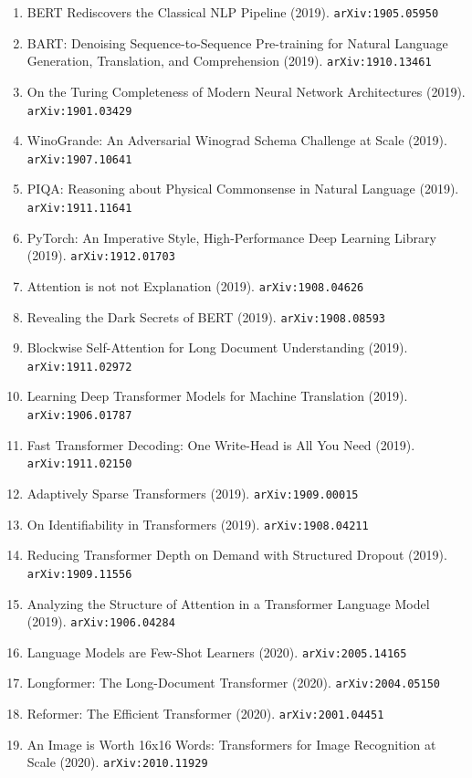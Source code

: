 \documentclass[11pt]{article}
\begin{document}
\begin{enumerate}
  \item BERT Rediscovers the Classical NLP Pipeline (2019). \texttt{arXiv:1905.05950}
  \item BART: Denoising Sequence-to-Sequence Pre-training for Natural Language
  Generation, Translation, and Comprehension (2019). \texttt{arXiv:1910.13461}
  \item On the Turing Completeness of Modern Neural Network Architectures (2019). \texttt{arXiv:1901.03429}
  \item WinoGrande: An Adversarial Winograd Schema Challenge at Scale (2019). \texttt{arXiv:1907.10641}
  \item PIQA: Reasoning about Physical Commonsense in Natural Language (2019). \texttt{arXiv:1911.11641}
  \item PyTorch: An Imperative Style, High-Performance Deep Learning Library (2019). \texttt{arXiv:1912.01703}
  \item Attention is not not Explanation (2019). \texttt{arXiv:1908.04626}
  \item Revealing the Dark Secrets of BERT (2019). \texttt{arXiv:1908.08593}
  \item Blockwise Self-Attention for Long Document Understanding (2019). \texttt{arXiv:1911.02972}
  \item Learning Deep Transformer Models for Machine Translation (2019). \texttt{arXiv:1906.01787}
  \item Fast Transformer Decoding: One Write-Head is All You Need (2019). \texttt{arXiv:1911.02150}
  \item Adaptively Sparse Transformers (2019). \texttt{arXiv:1909.00015}
  \item On Identifiability in Transformers (2019). \texttt{arXiv:1908.04211}
  \item Reducing Transformer Depth on Demand with Structured Dropout (2019). \texttt{arXiv:1909.11556}
  \item Analyzing the Structure of Attention in a Transformer Language Model (2019). \texttt{arXiv:1906.04284}
  \item Language Models are Few-Shot Learners (2020). \texttt{arXiv:2005.14165}
  \item Longformer: The Long-Document Transformer (2020). \texttt{arXiv:2004.05150}
  \item Reformer: The Efficient Transformer (2020). \texttt{arXiv:2001.04451}
  \item An Image is Worth 16x16 Words: Transformers for Image Recognition at
  Scale (2020). \texttt{arXiv:2010.11929}

\end{enumerate}
\end{document}
